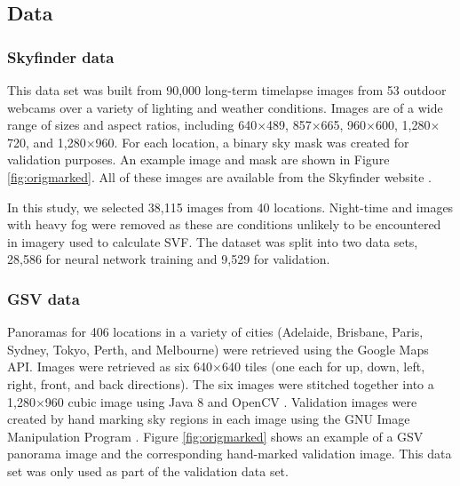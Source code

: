 \documentclass[final,3p,times,authoryear]{elsarticle}
\begin{document}
\subsection{Data}\label{sec:data}

\subsubsection{Skyfinder data}\label{sec:finderdata}
This data set was built from 90,000 long-term timelapse images from 53 outdoor webcams over a variety of lighting and weather conditions. Images are of a wide range of sizes and aspect ratios, including 640$\times$489, 857$\times$665, 960$\times$600, 1,280$\times$720, and 1,280$\times$960. For each location, a binary sky mask was created for validation purposes. An example image and mask are shown in Figure \ref{fig:origmarked}. All of these images are available from the Skyfinder website \citep{Mihail2015}.

In this study, we selected 38,115 images from 40 locations. Night-time and images with heavy fog were removed as these are conditions unlikely to be encountered in imagery used to calculate SVF. The dataset was split into two data sets, 28,586 for neural network training and 9,529 for validation.

\subsubsection{GSV data}\label{sec:gsvdata}
Panoramas for 406 locations in a variety of cities (Adelaide, Brisbane, Paris, Sydney, Tokyo, Perth, and Melbourne) were retrieved using the Google Maps API. Images were retrieved as six 640$\times$640 tiles (one each for up, down, left, right, front, and back directions). The six images were stitched together into a 1,280$\times$960 cubic image using Java 8 \citep{Oracle2018} and OpenCV \citep {Bradski2000}. Validation images were created by hand marking sky regions in each image using the GNU Image Manipulation Program \citep{GIMP2019}. Figure \ref{fig:origmarked} shows an example of a GSV panorama image and the corresponding hand-marked validation image. This data set was only used as part of the validation data set.

\end{document}
